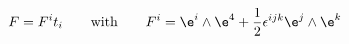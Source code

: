 \begin{equation}
F=F^i t_i\qquad\hbox{with}\qquad F^i=\e^i\wedge\e^4 +{1\over 2}\epsilon^{ijk}
\e^j\wedge\e^k
\end{equation}

